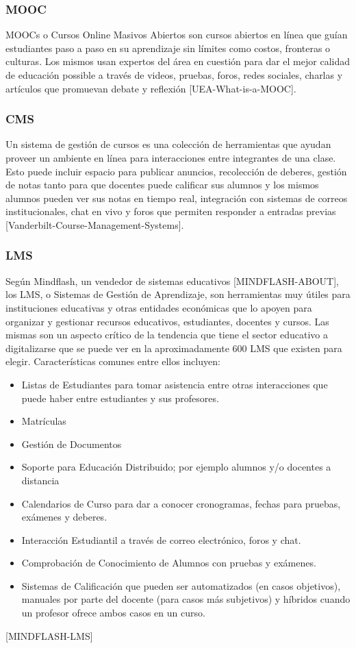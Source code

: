\subsubsection{MOOC}
MOOCs o Cursos Online Masivos Abiertos son cursos abiertos en línea que guían estudiantes paso a paso en su aprendizaje sin límites como costos, fronteras o culturas. Los mismos usan expertos del área en cuestión para dar el mejor calidad de educación possible a través de videos, pruebas, foros, redes sociales, charlas y artículos que promuevan debate y reflexión [UEA-What-is-a-MOOC].

\subsubsection{CMS}
Un sistema de gestión de cursos es una colección de herramientas que ayudan proveer un ambiente en línea para interacciones entre integrantes de una clase. Esto puede incluir espacio para publicar anuncios, recolección de deberes, gestión de notas tanto para que docentes puede calificar sus alumnos y los mismos alumnos pueden ver sus notas en tiempo real, integración con sistemas de correos institucionales, chat en vivo y foros que permiten responder a entradas previas  [Vanderbilt-Course-Management-Systems].

\subsubsection{LMS}
Según Mindflash, un vendedor de sistemas educativos [MINDFLASH-ABOUT], los LMS, o Sistemas de Gestión de Aprendizaje, son herramientas muy útiles para instituciones educativas y otras entidades económicas que lo apoyen para organizar y gestionar recursos educativos, estudiantes, docentes y cursos. Las mismas son un aspecto crítico de la tendencia que tiene el sector educativo a digitalizarse que se puede ver en la aproximadamente 600 LMS que existen para elegir. Características comunes entre ellos incluyen:
\begin{itemize}
	\item Listas de Estudiantes para tomar asistencia entre otras interacciones que puede haber entre estudiantes y sus profesores.
    \item Matrículas
    \item Gestión de Documentos
    \item Soporte para Educación Distribuido; por ejemplo alumnos y/o docentes a distancia
    \item Calendarios de Curso para dar a conocer cronogramas, fechas para pruebas, exámenes y deberes.
    \item Interacción Estudiantil a través de correo electrónico, foros y chat.
    \item Comprobación de Conocimiento de Alumnos con pruebas y exámenes.
    \item Sistemas de Calificación que pueden ser automatizados (en casos objetivos), manuales por parte del docente (para casos más subjetivos) y híbridos cuando un profesor ofrece ambos casos en un curso.
\end{itemize}
[MINDFLASH-LMS]


